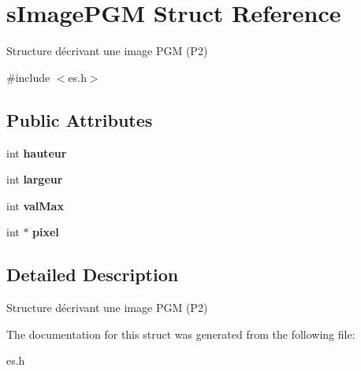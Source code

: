 \hypertarget{structs_image_p_g_m}{}\section{s\+Image\+P\+GM Struct Reference}
\label{structs_image_p_g_m}


Structure décrivant une image P\+GM (P2)  




{\ttfamily \#include $<$es.\+h$>$}

\subsection*{Public Attributes}
\begin{DoxyCompactItemize}
\item 
\mbox{\label{structs_image_p_g_m_a279ca2d304ec535abf850fd9a52e8863}} 
int {\bfseries hauteur}
\item 
\mbox{\label{structs_image_p_g_m_acadef8c95094268e688795988307a442}} 
int {\bfseries largeur}
\item 
\mbox{\label{structs_image_p_g_m_ae48edd2c949f5ee2c1074637162fdaaa}} 
int {\bfseries val\+Max}
\item 
\mbox{\label{structs_image_p_g_m_a641d51a65e351ed98c94238b87774041}} 
int $\ast$ {\bfseries pixel}
\end{DoxyCompactItemize}


\subsection{Detailed Description}
Structure décrivant une image P\+GM (P2) 

The documentation for this struct was generated from the following file\+:\begin{DoxyCompactItemize}
\item 
es.\+h\end{DoxyCompactItemize}
